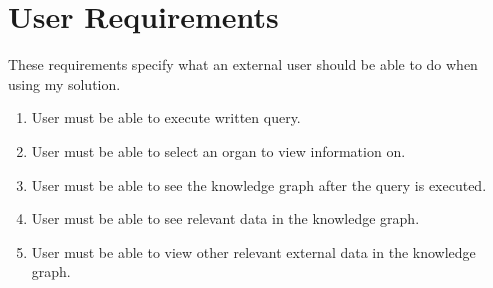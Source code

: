 \section{User Requirements}
\hspace{0.5cm} These requirements specify what an external user should be able to do when using my solution.
\begin{enumerate}
    \itemsep0em 
\item User must be able to execute written query.
\item User must be able to select an organ to view information on. 
\item User must be able to see the knowledge graph after the query is executed.
\item User must be able to see relevant data in the knowledge graph.
\item User must be able to view other relevant external data in the knowledge graph.
\end{enumerate}

